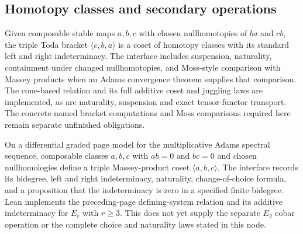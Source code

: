 \subsection{Homotopy classes and secondary operations}

\begin{definition}
  \label{def:toda-bracket}
  \notready
  Given composable stable maps $a,b,c$ with chosen nullhomotopies of $ba$ and
  $cb$, the triple Toda bracket $\langle c,b,a\rangle$ is a coset of homotopy
  classes with its standard left and right indeterminacy.  The interface
  includes suspension, naturality, containment under changed nullhomotopies,
  and Moss-style comparison with Massey products when an Adams convergence
  theorem supplies that comparison.
  The cone-based relation and its full additive coset and juggling laws
  are implemented, as are naturality, suspension and exact tensor-functor
  transport. The concrete named bracket computations and Moss comparisons
  required here remain separate unfinished obligations.
\end{definition}

\begin{definition}
  \label{def:massey-product}
  \notready
  On a differential graded page model for the multiplicative Adams spectral
  sequence, composable classes $a,b,c$ with $ab=0$ and $bc=0$ and chosen
  nullhomologies define a triple Massey-product coset
  $\langle a,b,c\rangle$.  The interface records its bidegree, left and right
  indeterminacy, naturality, change-of-choice formula, and a proposition that
  the indeterminacy is zero in a specified finite bidegree.
  Lean implements the preceding-page defining-system relation and its
  additive indeterminacy for $E_r$ with $r\ge3$. This does not yet supply
  the separate $E_2$ cobar operation or the complete choice and naturality
  laws stated in this node.
\end{definition}
